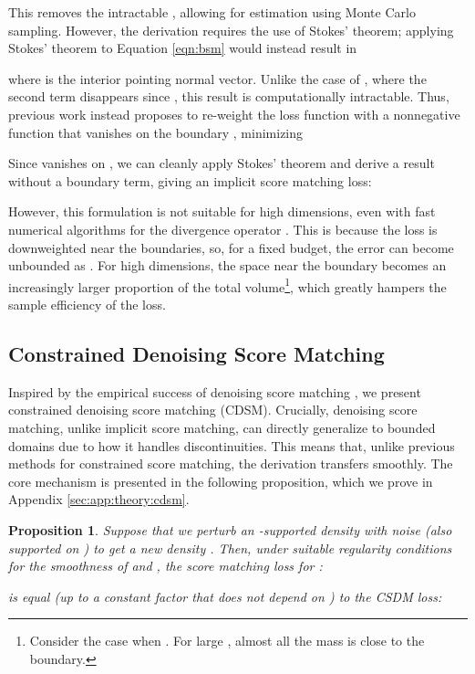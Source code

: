 \documentclass{article}
\theoremstyle{plain}
\newtheorem{proposition}[theorem]{Proposition}
\theoremstyle{definition}
\theoremstyle{remark}
\begin{document}
This removes the intractable , allowing for estimation using Monte Carlo sampling. However, the derivation requires the use of Stokes' theorem; applying Stokes' theorem to Equation \ref{eqn:bsm} would instead result in

where  is the interior pointing normal vector. Unlike the case of , where the second term disappears since , this result is computationally intractable. Thus, previous work instead proposes to re-weight the loss function with a nonnegative function  that vanishes on the boundary \citep{Hyvrinen2007SomeEO, Yu2020GeneralizedSM}, minimizing

Since  vanishes on , we can cleanly apply Stokes' theorem and derive a result without a boundary term, giving an implicit score matching loss:

However, this formulation is not suitable for high dimensions, even with fast numerical algorithms for the divergence operator \citep{Hutchinson1989ASE, Song2019SlicedSM}. This is because the loss is downweighted near the boundaries, so, for a fixed budget, the error can become unbounded as . For high dimensions, the space near the boundary becomes an increasingly larger proportion of the total volume\footnote{Consider the case when . For large , almost all the mass is close to the boundary.}, which greatly hampers the sample efficiency of the loss.

\subsection{Constrained Denoising Score Matching}

Inspired by the empirical success of denoising score matching \citep{Vincent2011ACB, Song2019GenerativeMB}, we present constrained denoising score matching (CDSM). Crucially, denoising score matching, unlike implicit score matching, can directly generalize to bounded domains due to how it handles discontinuities. This means that, unlike previous methods for constrained score matching, the derivation transfers smoothly. The core mechanism is presented in the following proposition, which we prove in Appendix \ref{sec:app:theory:cdsm}.
\begin{proposition}\label{prop:cdsm}
    Suppose that we perturb an -supported density  with noise  (also supported on ) to get a new density . Then, under suitable regularity conditions for the smoothness of  and , the score matching loss for :
    
    is equal (up to a constant factor that does not depend on ) to the CSDM loss:
    
\end{proposition}
\end{document}
